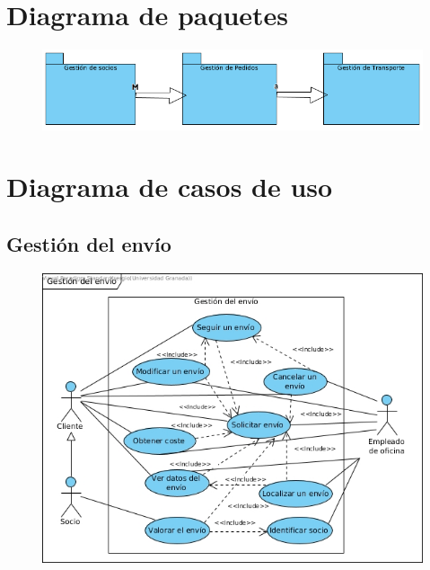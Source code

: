 \newpage

\section{Diagrama de paquetes}
\begin{figure}[h]
	\centering
	\includegraphics[width=15cm]{diagra_paquetes}
\end{figure}
\newpage

\section{Diagrama de casos de uso}
\subsection{Gestión del envío}
\begin{figure}[h]
	\centering
		\includegraphics[width=15cm]{diagr_envio}
\end{figure}

\newpage

